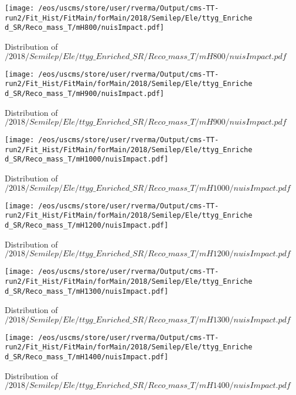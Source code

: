 \begin{figure}
\centering
\texttt{[image: /eos/uscms/store/user/rverma/Output/cms-TT-run2/Fit\_Hist/FitMain/forMain/2018/Semilep/Ele/ttyg\_Enriched\_SR/Reco\_mass\_T/mH800/nuisImpact.pdf]}
\caption{Distribution of $/2018/Semilep/Ele/ttyg\_Enriched\_SR/Reco\_mass\_T/mH800/nuisImpact.pdf$}
\end{figure}

\begin{figure}
\centering
\texttt{[image: /eos/uscms/store/user/rverma/Output/cms-TT-run2/Fit\_Hist/FitMain/forMain/2018/Semilep/Ele/ttyg\_Enriched\_SR/Reco\_mass\_T/mH900/nuisImpact.pdf]}
\caption{Distribution of $/2018/Semilep/Ele/ttyg\_Enriched\_SR/Reco\_mass\_T/mH900/nuisImpact.pdf$}
\end{figure}

\begin{figure}
\centering
\texttt{[image: /eos/uscms/store/user/rverma/Output/cms-TT-run2/Fit\_Hist/FitMain/forMain/2018/Semilep/Ele/ttyg\_Enriched\_SR/Reco\_mass\_T/mH1000/nuisImpact.pdf]}
\caption{Distribution of $/2018/Semilep/Ele/ttyg\_Enriched\_SR/Reco\_mass\_T/mH1000/nuisImpact.pdf$}
\end{figure}

\begin{figure}
\centering
\texttt{[image: /eos/uscms/store/user/rverma/Output/cms-TT-run2/Fit\_Hist/FitMain/forMain/2018/Semilep/Ele/ttyg\_Enriched\_SR/Reco\_mass\_T/mH1200/nuisImpact.pdf]}
\caption{Distribution of $/2018/Semilep/Ele/ttyg\_Enriched\_SR/Reco\_mass\_T/mH1200/nuisImpact.pdf$}
\end{figure}

\begin{figure}
\centering
\texttt{[image: /eos/uscms/store/user/rverma/Output/cms-TT-run2/Fit\_Hist/FitMain/forMain/2018/Semilep/Ele/ttyg\_Enriched\_SR/Reco\_mass\_T/mH1300/nuisImpact.pdf]}
\caption{Distribution of $/2018/Semilep/Ele/ttyg\_Enriched\_SR/Reco\_mass\_T/mH1300/nuisImpact.pdf$}
\end{figure}

\begin{figure}
\centering
\texttt{[image: /eos/uscms/store/user/rverma/Output/cms-TT-run2/Fit\_Hist/FitMain/forMain/2018/Semilep/Ele/ttyg\_Enriched\_SR/Reco\_mass\_T/mH1400/nuisImpact.pdf]}
\caption{Distribution of $/2018/Semilep/Ele/ttyg\_Enriched\_SR/Reco\_mass\_T/mH1400/nuisImpact.pdf$}
\end{figure}

